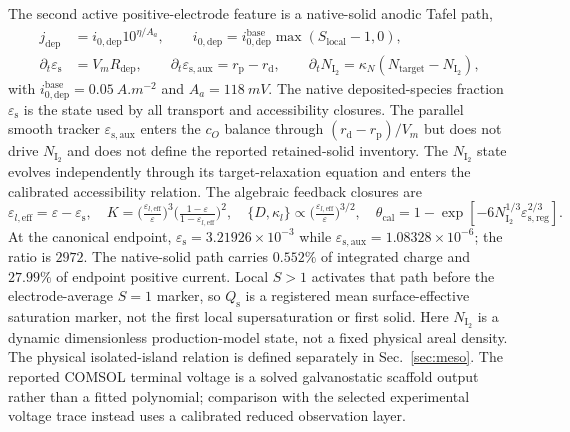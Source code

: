 \documentclass[11pt]{article}
\newcommand{\epss}{\varepsilon_{\mathrm{s}}}
\newcommand{\thetacal}{\theta_{\mathrm{cal}}}
\begin{document}
The second active positive-electrode feature is a native-solid anodic Tafel path,
\begin{equation}
\begin{aligned}
j_{\mathrm{dep}}&=i_{0,\mathrm{dep}}10^{\eta/A_a},\qquad
i_{0,\mathrm{dep}}=i_{0,\mathrm{dep}}^{\mathrm{base}}\max(S_{\mathrm{local}}-1,0),\\
\partial_t\epss&=V_mR_{\mathrm{dep}},\qquad
\partial_t\varepsilon_{\mathrm{s,aux}}=r_{\mathrm p}-r_{\mathrm d},\qquad
\partial_tN_{\mathrm{I_2}}=\kappa_N(N_{\mathrm{target}}-N_{\mathrm{I_2}}),
\end{aligned}
\end{equation}
with $i_{0,\mathrm{dep}}^{\mathrm{base}}=\SI{0.05}{A.m^{-2}}$ and $A_a=\SI{118}{mV}$. The native
deposited-species fraction $\epss$ is the state used by all transport and accessibility closures. The
parallel smooth tracker $\varepsilon_{\mathrm{s,aux}}$ enters the $c_O$ balance through
$(r_{\mathrm d}-r_{\mathrm p})/V_m$ but does not drive $N_{\mathrm{I_2}}$ and does not define the reported
retained-solid inventory. The $N_{\mathrm{I_2}}$ state evolves independently through its target-relaxation
equation and enters the calibrated accessibility relation. The algebraic feedback closures are
\begin{equation}
\varepsilon_{l,\mathrm{eff}}=\varepsilon-\epss,\quad
K=\Big(\tfrac{\varepsilon_{l,\mathrm{eff}}}{\varepsilon}\Big)^3\Big(\tfrac{1-\varepsilon}{1-\varepsilon_{l,\mathrm{eff}}}\Big)^2,\quad
\{D,\kappa_l\}\!\propto\!\Big(\tfrac{\varepsilon_{l,\mathrm{eff}}}{\varepsilon}\Big)^{3/2},\quad
\thetacal=1-\exp\!\left[-6N_{\mathrm{I_2}}^{1/3}\varepsilon_{\mathrm{s,reg}}^{2/3}\right].
\label{eq:closures-ref}
\end{equation}
At the canonical endpoint, $\epss=3.21926\times10^{-3}$ while
$\varepsilon_{\mathrm{s,aux}}=1.08328\times10^{-6}$; the ratio is $2972$. The native-solid path carries
$0.552\%$ of integrated charge and $27.99\%$ of endpoint positive current. Local $S>1$ activates that path
before the electrode-average $S=1$ marker, so $Q_{\mathrm s}$ is a registered mean surface-effective
saturation marker, not the first local supersaturation or first solid.
Here $N_{\mathrm{I_2}}$ is a dynamic dimensionless production-model state, not a fixed physical areal
density. The physical isolated-island relation is defined separately in Sec.~\ref{sec:meso}. The reported
COMSOL terminal voltage is a solved galvanostatic scaffold output rather than a fitted polynomial; comparison
with the selected experimental voltage trace instead uses a calibrated reduced observation layer.
\end{document}
